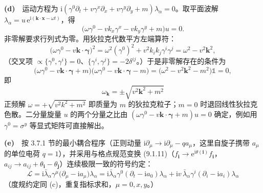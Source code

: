\textbf{(d)}　运动方程为 $\mathrm{i}(\gamma^0\partial_t+v\gamma^x\partial_x+v\gamma^y\partial_y+m)\lambda_\alpha=0$。取平面波解 $\lambda_\alpha=u\,\mathrm{e}^{\mathrm{i}(\pmb{k}\cdot\pmb{x}-\omega t)}$，得
\begin{equation*}
\big(\omega\gamma^0-vk_x\gamma^x-vk_y\gamma^y+m\big)u=0 .
\end{equation*}
非零解要求行列式为零。用狄拉克代数平方左端算符：
\begin{equation*}
\big(\omega\gamma^0-v\pmb{k}\cdot\pmb{\gamma}\big)^2
=\omega^2(\gamma^0)^2+v^2k_ik_j\gamma^i\gamma^j
=\omega^2-v^2\pmb{k}^2 ,
\end{equation*}
（交叉项 $\propto\{\gamma^0,\gamma^i\}=0$、$\{\gamma^i,\gamma^j\}=-2\delta^{ij}$。）于是非零解存在的条件为
\begin{equation*}
\big(\omega\gamma^0-v\pmb{k}\cdot\pmb{\gamma}+m\big)\big(\omega\gamma^0-v\pmb{k}\cdot\pmb{\gamma}-m\big)
=\big(\omega^2-v^2\pmb{k}^2-m^2\big)\mathbb{1}=0 ,
\end{equation*}
即
\begin{equation*}
\boxed{\;\omega_{\pmb{k}}=\pm\sqrt{v^2\pmb{k}^2+m^2}\;}
\end{equation*}
正频解 $\omega=+\sqrt{v^2k^2+m^2}$ 即质量为 $m$ 的狄拉克粒子；$m=0$ 时退回线性狄拉克色散。二分量旋量 $u$ 的两个分量之比由 $(\omega\gamma^0-v\pmb{k}\cdot\pmb{\gamma}+m)u=0$ 确定，例如用 $\gamma^0=\sigma^y$ 等显式矩阵可直接解出。

\textbf{(e)}　按 3.7.1 节的最小耦合程序（正则动量 $\mathrm{i}\partial_\mu\to\mathrm{i}\partial_\mu-q a_\mu$，这里自旋子携带 $a_\mu$ 的单位电荷 $q=1$），并采用与格点规范变换 (9.1.11)（$f_{\pmb{i}}\to\mathrm{e}^{\mathrm{i}\theta(\pmb{i})}f_{\pmb{i}}$，$a_{ij}\to a_{ij}+\theta_{\pmb{i}}-\theta_{\pmb{j}}$）连续极限一致的符号约定：
\begin{equation*}
\boxed{\;\mathcal{L}=\mathrm{i}\bar{\lambda}_{\alpha}\gamma^{\mu}\big(\partial_{\mu}-\mathrm{i}a_{\mu}\big)\lambda_{\alpha}
=\mathrm{i}\bar{\lambda}_{\alpha}\gamma^0(\partial_t-\mathrm{i}a_0)\lambda_{\alpha}
+\mathrm{i}v\,\bar{\lambda}_{\alpha}\gamma^i(\partial_i-\mathrm{i}a_i)\lambda_{\alpha}\;}
\end{equation*}
（度规约定同 (c)，重复指标求和，$\mu=0,x,y$。）

